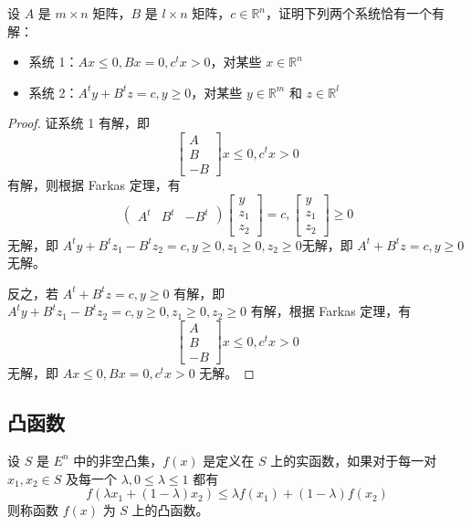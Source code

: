 \begin{example}
    设 $A$ 是 $m\times n$ 矩阵，$B$ 是 $l \times n$ 矩阵，$c\in\mathbb{R}^n$，证明下列两个系统恰有一个有解：
    \begin{itemize}
        \item 系统 1：$Ax \le 0, Bx = 0, c^tx > 0$，对某些 $x\in\mathbb{R}^n$
        \item 系统 2：$A^ty + B^tz = c, y \ge 0$，对某些 $y \in \mathbb{R}^m$ 和 $z\in\mathbb{R}^l$
    \end{itemize}  

    \begin{proof}
        证系统 1 有解，即
        \[
            \begin{bmatrix}
                A\\
                B\\
                -B
            \end{bmatrix}x\le 0, c^tx>0
        \]
        有解，则根据 Farkas 定理，有
        \[
            \begin{pmatrix}
                A^t & B^t & -B^t
            \end{pmatrix}\begin{bmatrix}
                y\\
                z_1\\
                z_2
            \end{bmatrix}=c,\begin{bmatrix}
                y\\
                z_1\\
                z_2
            \end{bmatrix}\ge 0
        \]
        无解，即 $A^ty + B^tz_1 - B^tz_2 = c, y\ge 0, z_1\ge 0, z_2\ge 0$无解，即 $A^t + B^tz = c, y\ge 0$ 无解。
        
        反之，若 $A^t + B^tz = c, y\ge 0$ 有解，即 $A^ty + B^tz_1 - B^tz_2 = c, y\ge 0, z_1\ge 0, z_2\ge 0$ 有解，根据 Farkas 定理，有 
        \[
            \begin{bmatrix}
                A\\
                B\\
                -B
            \end{bmatrix}x\le 0, c^tx>0
        \]
        无解，即 $Ax \le 0, Bx = 0, c^tx > 0$ 无解。
    \end{proof}
\end{example}

\subsection{凸函数}
\begin{definition}[凸函数]
    设 $S$ 是 $E^n$ 中的非空凸集，$f(x)$ 是定义在 $S$ 上的实函数，如果对于每一对 $x_1, x_2 \in S$ 及每一个 $\lambda, 0\le \lambda \le 1$ 都有 \[f(\lambda x_1 + (1 - \lambda)x_2) \le \lambda f(x_1) + (1 - \lambda)f(x_2)\]
    则称函数 $f(x)$ 为 $S$ 上的凸函数。
\end{definition}

